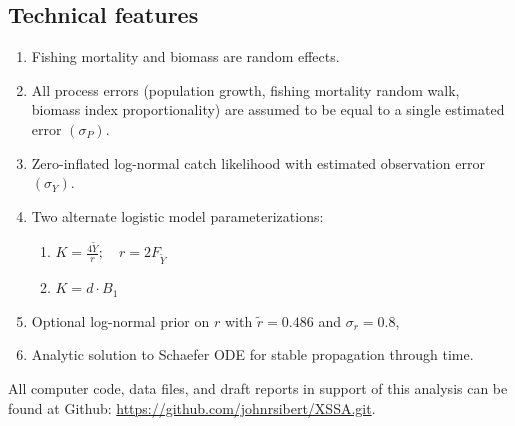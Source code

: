 \documentclass[letterpaper,KOMA,landscape,titlepage]{powersem}
\newcommand\MSY{\widetilde{Y}}
\newcommand\Fmsy{F_{\MSY}}
\begin{document}
\begin{slide}\section{Technical features}
\begin{enumerate}
\item Fishing mortality and biomass are random effects.
\item All process errors (population growth, fishing
mortality random walk, biomass index proportionality) are assumed
to be equal to a single estimated error $(\sigma_P)$.
\item Zero-inflated log-normal catch likelihood with estimated
observation error $(\sigma_Y)$.
\item Two alternate logistic model parameterizations:
\begin{enumerate}
\item $K = \frac{4\MSY}{r};\quad r = 2\Fmsy$
\item $K = d\cdot B_1$
\end{enumerate}
\item Optional log-normal prior on $r$ with 
$\tilde{r} = 0.486$ and $\sigma_r = 0.8$,
\item Analytic solution to Schaefer ODE for stable propagation
through time.
\end{enumerate}
\vfill
\par All computer code, data files, and draft reports in support of this
analysis can be found at Github:
\url{https://github.com/johnrsibert/XSSA.git}.
\end{slide}
\end{document}
